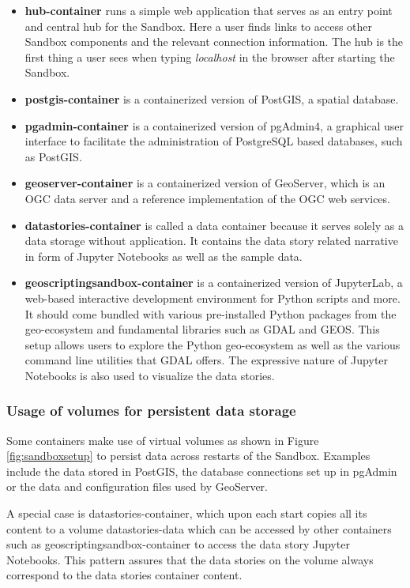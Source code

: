 \documentclass[11pt, a4paper, oneside, parskip=full-]{scrartcl}
\begin{document}
\begin{itemize}
  \item \textbf{hub-container} runs a simple web application that serves as an
  entry point and central hub for the Sandbox. Here a user finds links to access
  other Sandbox components and the relevant connection information. The hub is
  the first thing a user sees when typing \emph{localhost} in the browser after
  starting the Sandbox.
  \item \textbf{postgis-container} is a containerized version of PostGIS, a
  spatial database.
  \item \textbf{pgadmin-container} is a containerized version of pgAdmin4, a
  graphical user interface to facilitate the administration of PostgreSQL based
  databases, such as PostGIS.
  \item \textbf{geoserver-container} is a containerized version of GeoServer,
  which is an OGC data server and a reference implementation of the OGC web
  services.
  \item \textbf{datastories-container} is called a data container because it
  serves solely as a data storage without application. It contains the data
  story related narrative in form of Jupyter Notebooks as well as the sample
  data.
  \item \textbf{geoscriptingsandbox-container} is a containerized version of
  JupyterLab, a web-based interactive development environment for Python scripts
  and more. It should come bundled with various pre-installed Python packages
  from the geo-ecosystem and fundamental libraries such as GDAL and
  GEOS\cite{geos}. This setup allows users to explore the Python geo-ecosystem
  as well as the various command line utilities that GDAL offers. The expressive
  nature of Jupyter Notebooks is also used to visualize the data stories.
\end{itemize}

\subsubsection*{Usage of volumes for persistent data storage}
Some containers make use of virtual volumes as shown in Figure
\ref{fig:sandboxsetup} to persist data across restarts of the Sandbox. Examples
include the data stored in PostGIS, the database connections set up in pgAdmin
or the data and configuration files used by GeoServer.

A special case is datastories-container, which upon each start copies all its
content to a volume datastories-data which can be accessed by other containers
such as geoscriptingsandbox-container to access the data story Jupyter
Notebooks. This pattern assures that the data stories on the volume always
correspond to the data stories container content.
\end{document}
